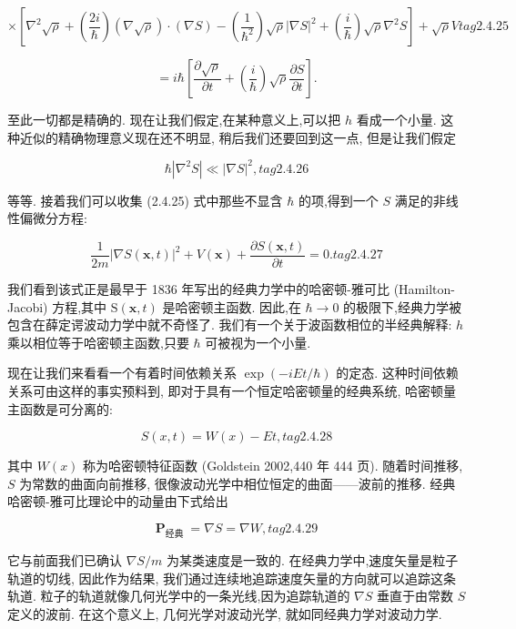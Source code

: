 \documentclass[lang=cn,newtx,10pt,scheme=chinese,thmcnt=section]{elegantbook}
\begin{document}
$$
\times \left\lbrack {{\nabla }^{2}\sqrt{\rho } + \left( \frac{2i}{\hbar }\right) \left( {\nabla \sqrt{\rho }}\right) \cdot \left( {\nabla S}\right) - \left( \frac{1}{{\hbar }^{2}}\right) \sqrt{\rho }{\left| \nabla S\right| }^{2} + \left( \frac{i}{\hbar }\right) \sqrt{\rho }{\nabla }^{2}S}\right\rbrack + \sqrt{\rho }V tag{2.4.25}
$$

$$
= i\hbar \left\lbrack {\frac{\partial \sqrt{\rho }}{\partial t} + \left( \frac{i}{\hbar }\right) \sqrt{\rho }\frac{\partial S}{\partial t}}\right\rbrack .
$$

至此一切都是精确的. 现在让我们假定,在某种意义上,可以把 $h$ 看成一个小量. 这种近似的精确物理意义现在还不明显, 稍后我们还要回到这一点, 但是让我们假定

$$
\hbar \left| {{\nabla }^{2}S}\right| \ll {\left| \nabla S\right| }^{2}, tag{2.4.26}
$$

等等. 接着我们可以收集 (2.4.25) 式中那些不显含 $\hbar$ 的项,得到一个 $S$ 满足的非线性偏微分方程:

$$
\frac{1}{2m}{\left| \nabla S\left( \mathbf{x}, t\right) \right| }^{2} + V\left( \mathbf{x}\right) + \frac{\partial S\left( {\mathbf{x}, t}\right) }{\partial t} = 0. tag{2.4.27}
$$

我们看到该式正是最早于 1836 年写出的经典力学中的哈密顿-雅可比 (Hamilton-Jacobi) 方程,其中 $\mathrm{S}\left( {\mathbf{x}, t}\right)$ 是哈密顿主函数. 因此,在 $\hbar \rightarrow 0$ 的极限下,经典力学被包含在薛定谔波动力学中就不奇怪了. 我们有一个关于波函数相位的半经典解释: $h$ 乘以相位等于哈密顿主函数,只要 $\hbar$ 可被视为一个小量.

现在让我们来看看一个有着时间依赖关系 $\exp \left( {-{iEt}/\hbar }\right)$ 的定态. 这种时间依赖关系可由这样的事实预料到, 即对于具有一个恒定哈密顿量的经典系统, 哈密顿量主函数是可分离的:

$$
S\left( {x, t}\right) = W\left( x\right) - {Et}, tag{2.4.28}
$$

其中 $W\left( x\right)$ 称为哈密顿特征函数 (Goldstein 2002,440 年 444 页). 随着时间推移, $S$ 为常数的曲面向前推移, 很像波动光学中相位恒定的曲面——波前的推移. 经典哈密顿-雅可比理论中的动量由下式给出

$$
{\mathbf{P}}_{\text{经典 }} = \nabla S = \nabla W, tag{2.4.29}
$$

它与前面我们已确认 $\nabla S/m$ 为某类速度是一致的. 在经典力学中,速度矢量是粒子轨道的切线, 因此作为结果, 我们通过连续地追踪速度矢量的方向就可以追踪这条轨道. 粒子的轨道就像几何光学中的一条光线,因为追踪轨道的 $\nabla S$ 垂直于由常数 $S$ 定义的波前. 在这个意义上, 几何光学对波动光学, 就如同经典力学对波动力学.
\end{document}
